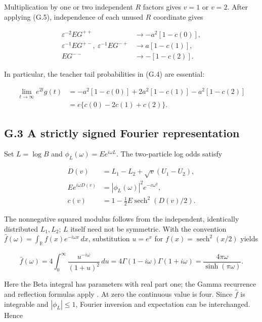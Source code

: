 \documentclass{article}
\begin{document}
Multiplication by one or two independent \(R\) factors gives \(v=1\) or
\(v=2\). After applying (G.5), independence of each unused \(R\)
coordinate gives

\[
\begin{aligned}
\varepsilon^{-2}EG^{++}&\longrightarrow-a^2[1-c(0)],\\
\varepsilon^{-1}EG^{+-},\ \varepsilon^{-1}EG^{-+}
&\longrightarrow a[1-c(1)],\\
EG^{--}&\longrightarrow-[1-c(2)].
\end{aligned}
\tag{G.7}
\]

In particular, the teacher tail probabilities in (G.4) are essential:

\[
\begin{aligned}
\lim_{t\to\infty}e^{2t}g(t)
&=-a^2[1-c(0)]+2a^2[1-c(1)]-a^2[1-c(2)]\\
&=e\{c(0)-2c(1)+c(2)\}.
\end{aligned}
\tag{G.8}
\]

\subsection*{G.3 A strictly signed Fourier
representation}\label{g.3-a-strictly-signed-fourier-representation}

Set \(L=\log B\) and \(\phi_L(\omega)=Ee^{i\omega L}\). The two-particle
log odds satisfy

\[
\begin{aligned}
D(v)&=L_1-L_2+\sqrt v(U_1-U_2),\\
Ee^{i\omega D(v)}&=|\phi_L(\omega)|^2e^{-v\omega^2},\\
c(v)&=1-\tfrac12E\operatorname{sech}^2(D(v)/2).
\end{aligned}
\tag{G.9}
\]

The nonnegative squared modulus follows from the independent,
identically distributed \(L_1,L_2\); \(L\) itself need not be symmetric.
With the convention
\(\widehat f(\omega)=\int_{\mathbb R}f(x)e^{-i\omega x}\,dx\),
substitution \(u=e^x\) for \(f(x)=\operatorname{sech}^2(x/2)\) yields

\[
\widehat f(\omega)
=4\int_0^\infty\frac{u^{-i\omega}}{(1+u)^2}\,du
=4\Gamma(1-i\omega)\Gamma(1+i\omega)
=\frac{4\pi\omega}{\sinh(\pi\omega)}.
\tag{G.10}
\]

Here the Beta integral has parameters with real part one; the Gamma
recurrence and reflection formulas apply \citep[Sections 5.12 and
5.5]{nistdlmf}. At zero the continuous value is four. Since
\(\widehat f\) is integrable and \(|\phi_L|\le1\), Fourier inversion and
expectation can be interchanged. Hence
\end{document}
